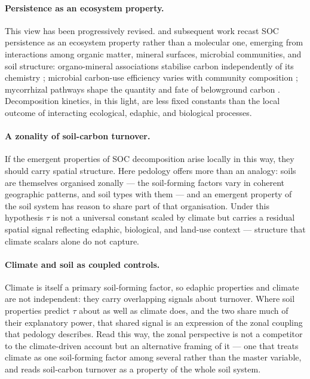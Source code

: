 \paragraph{Persistence as an ecosystem property.}
This view has been progressively revised. \citet{Schmidt2011} and subsequent work
recast SOC persistence as an ecosystem property rather than a molecular one,
emerging from interactions among organic matter, mineral surfaces, microbial
communities, and soil structure: organo-mineral associations stabilise carbon
independently of its chemistry
; microbial carbon-use efficiency varies with community composition
; mycorrhizal pathways shape the quantity and fate of belowground carbon
. Decomposition kinetics, in this light, are less fixed constants than the local
outcome of interacting ecological, edaphic, and biological processes.

\paragraph{A zonality of soil-carbon turnover.}
If the emergent properties of SOC decomposition arise locally in this way, they
should carry spatial structure. Here pedology offers more than an analogy: soils
are themselves organised zonally --- the soil-forming factors vary in coherent
geographic patterns, and soil types with them --- and an emergent property of the
soil system has reason to share part of that organisation. Under this hypothesis
$\tau$ is not a universal constant scaled by climate but carries a residual spatial
signal reflecting edaphic, biological, and land-use context --- structure that
climate scalars alone do not capture.

\paragraph{Climate and soil as coupled controls.}
Climate is itself a primary soil-forming factor, so edaphic properties and climate
are not independent: they carry overlapping signals about turnover. Where soil
properties predict $\tau$ about as well as climate does, and the two share much of
their explanatory power, that shared signal is an expression of the zonal coupling
that pedology describes. Read this way, the zonal perspective is not a competitor
to the climate-driven account but an alternative framing of it --- one that treats
climate as one soil-forming factor among several rather than the master variable,
and reads soil-carbon turnover as a property of the whole soil system.

